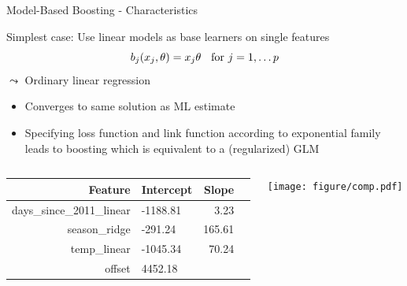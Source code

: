 \documentclass[11pt,compress,t,notes=noshow, aspectratio=169, xcolor=table]{beamer}
\begin{document}
\begin{frame}{Model-Based Boosting - Characteristics}

Simplest case: Use linear models as base learners on single features
$$
b_j(x_j, \theta) = x_j\theta \hspace*{0.2cm}\text{ for } j = 1,\ldots p
$$
$\leadsto$ Ordinary linear regression
\begin{itemize}
\item Converges to same solution as ML estimate
\item Specifying loss function and link function according to exponential family leads to boosting which is equivalent to a (regularized) GLM

\end{itemize}

\begin{columns}
\begin{column}{0.4\textwidth}
  \begin{table}[ht]
\centering
\begin{tabular}{rlrr}
  \hline
 Feature & Intercept & Slope \\ 
  \hline
days\_since\_2011\_linear & -1188.81 & 3.23 \\ 
 season\_ridge & -291.24 & 165.61 \\ 
 temp\_linear & -1045.34 & 70.24 \\ 
 offset & 4452.18 &  \\ 
   \hline
\end{tabular}
\end{table}
\end{column}
\begin{column}{0.6\textwidth}
  \texttt{[image: figure/comp.pdf]} 
\end{column}
\end{columns}
\end{frame}
\end{document}
